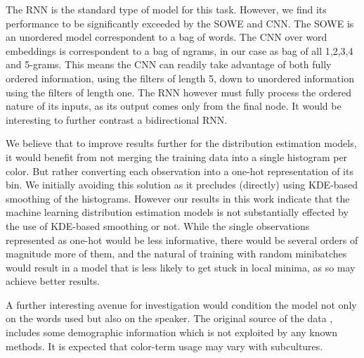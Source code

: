 \documentclass[11pt,a4paper]{article}
\newcommand{\textcite}{\citet}
\begin{document}
The RNN is the standard type of model for this task.
However, we find its performance to be significantly exceeded by the SOWE and CNN.
The SOWE is an unordered model correspondent to a bag of words.
The CNN over word embeddings is correspondent to a bag of ngrams, in our case as bag of all 1,2,3,4 and 5-grams.
This means the CNN can readily take advantage of both fully ordered information, using the filters of length 5, down to unordered information using the filters of length one.
The RNN however must fully process the ordered nature of its inputs, as its output comes only from the final node.
It would be interesting to further contrast a bidirectional RNN.


We believe that to improve results further for the distribution estimation models,
it would benefit from not merging the training data into a single histogram per color.
But rather converting each observation into a one-hot representation of its bin.
We initially avoiding this solution as it precludes (directly) using KDE-based smoothing of the histograms.
However our results in this work indicate that the machine learning distribution estimation models is not substantially effected by the use of KDE-based smoothing or not.
While the single observations represented as one-hot would be less informative, there would be several orders of magnitude more of them, and the natural of training with random minibatches would result in a model that is less likely to get stuck in local minima, as so may achieve better results.

A further interesting avenue for investigation would condition the model not only on the words used but also on the speaker.
The original source of the data \textcite{Munroe2010XKCDdataset}, includes some demographic information which is not exploited by any known methods.
It is expected that color-term usage may vary with subcultures.



\clearpage


\clearpage
\appendix

\end{document}
